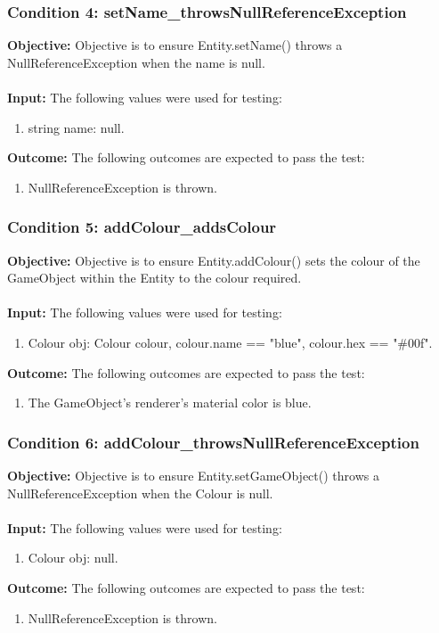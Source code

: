 \documentclass[a4paper,12pt]{article}
\begin{document}
		\subsubsection{Condition 4: setName\_throwsNullReferenceException}
			\textbf{Objective:} Objective is to ensure Entity.setName() throws a NullReferenceException when the name is null.\\\\
			\textbf{Input:} The following values were used for testing:
				\begin{enumerate}
					\item string name: null.
				\end{enumerate}
			\textbf{Outcome:} The following outcomes are expected to pass the test:
				\begin{enumerate}
					\item NullReferenceException is thrown.
				\end{enumerate}
		\subsubsection{Condition 5: addColour\_addsColour}
			\textbf{Objective:} Objective is to ensure Entity.addColour() sets the colour of the GameObject within the Entity to the colour required.\\\\
			\textbf{Input:} The following values were used for testing:
				\begin{enumerate}
					\item Colour obj: Colour colour, colour.name == "blue", colour.hex == "\#00f".
				\end{enumerate}
			\textbf{Outcome:} The following outcomes are expected to pass the test:
				\begin{enumerate}
					\item The GameObject's renderer's material color is blue.
				\end{enumerate}
		\subsubsection{Condition 6: addColour\_throwsNullReferenceException}
			\textbf{Objective:} Objective is to ensure Entity.setGameObject() throws a NullReferenceException when the Colour is null.\\\\
			\textbf{Input:} The following values were used for testing:
				\begin{enumerate}
					\item Colour obj: null.
				\end{enumerate}
			\textbf{Outcome:} The following outcomes are expected to pass the test:
				\begin{enumerate}
					\item NullReferenceException is thrown.
				\end{enumerate}
\end{document}
